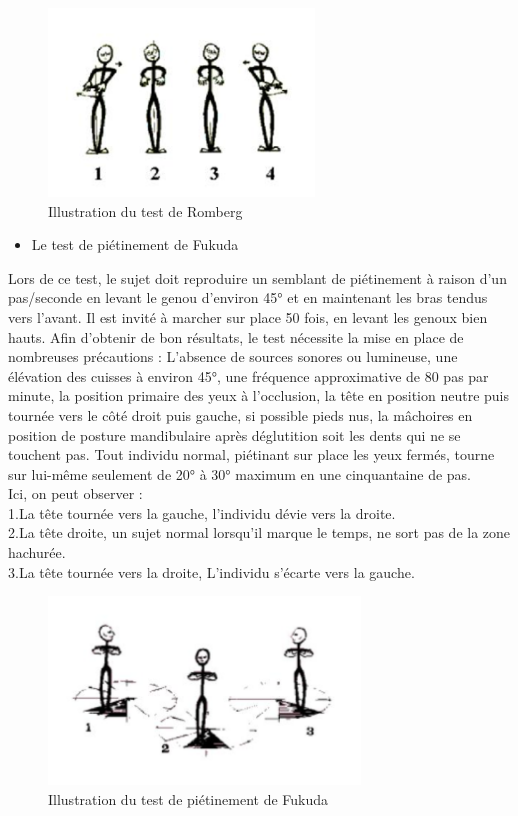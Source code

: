 \begin{figure}[H]
    \centering
    \includegraphics[height=5cm]{images/Exam_cli/Romberg.png}
    \caption{Illustration du test de Romberg}
    \label{fig:test_de_romberg}
\end{figure}


\begin{itemize}
    \item Le test de piétinement de Fukuda
\end{itemize}

Lors de ce test, le sujet doit reproduire un semblant de piétinement à raison d’un pas/seconde en levant le genou d’environ 45° et en maintenant les bras tendus vers l’avant. Il est invité à marcher sur place 50 fois, en levant les genoux bien hauts.
Afin d’obtenir de bon résultats, le test nécessite la mise en place de nombreuses précautions :  L'absence de sources sonores ou lumineuse, une élévation des cuisses à environ 45°, une fréquence approximative de 80 pas par minute, la position primaire des yeux à l'occlusion, la tête en position neutre puis tournée vers le côté droit puis gauche, si possible pieds nus, la mâchoires en position de posture mandibulaire après déglutition soit les dents qui ne se touchent pas.
Tout individu normal, piétinant sur place les yeux fermés, tourne sur lui-même seulement de 20° à 30° maximum en une cinquantaine de pas.\\

Ici, on peut observer :\\
1.La tête tournée vers la gauche, l’individu dévie vers la droite.\\
2.La tête droite, un sujet normal lorsqu’il marque le temps, ne sort pas de la zone hachurée.\\
3.La tête tournée vers la droite, L’individu s’écarte vers la gauche.

\begin{figure}[H]
    \centering
    \includegraphics[height=5cm]{images/Exam_cli/pietinement.png}
    \caption{Illustration du test de piétinement de Fukuda} 
    \label{fig:test_de_Fukuda}
\end{figure}



